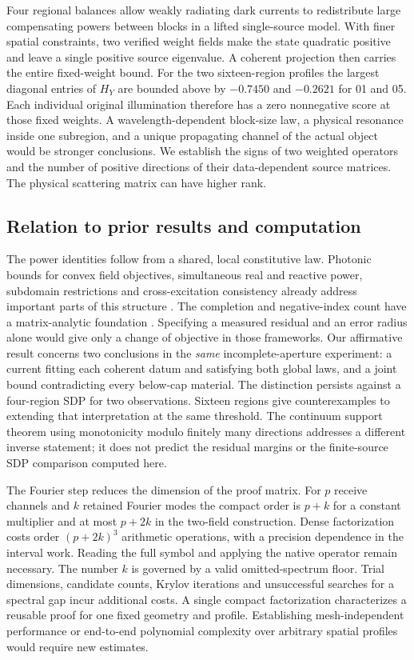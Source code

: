 \documentclass[anonymous,12pt]{iopjournal}
\theoremstyle{remark}\newtheorem{remark}[theorem]{Remark}
\numberwithin{equation}{section}
\begin{document}
Four regional balances allow weakly radiating dark currents to redistribute large compensating powers between blocks in a lifted single-source model. With finer spatial constraints, two verified weight fields make the state quadratic positive and leave a single positive source eigenvalue. A coherent projection then carries the entire fixed-weight bound. For the two sixteen-region profiles the largest diagonal entries of $H_Y$ are bounded above by $-0.7450$ and $-0.2621$ for 01 and 05. Each individual original illumination therefore has a zero nonnegative score at those fixed weights. A wavelength-dependent block-size law, a physical resonance inside one subregion, and a unique propagating channel of the actual object would be stronger conclusions. We establish the signs of two weighted operators and the number of positive directions of their data-dependent source matrices. The physical scattering matrix can have higher rank.

\subsection{Relation to prior results and computation}
The power identities follow from a shared, local constitutive law. Photonic bounds for convex field objectives, simultaneous real and reactive power, subdomain restrictions and cross-excitation consistency already address important parts of this structure \cite{trivedi,moleskyglobal,moleskylocal,shim}. The completion and negative-index count have a matrix-analytic foundation \cite{tian}. Specifying a measured residual and an error radius alone would give only a change of objective in those frameworks. Our affirmative result concerns two conclusions in the \emph{same} incomplete-aperture experiment: a current fitting each coherent datum and satisfying both global laws, and a joint bound contradicting every below-cap material. The distinction persists against a four-region SDP for two observations. Sixteen regions give counterexamples to extending that interpretation at the same threshold. The continuum support theorem using monotonicity modulo finitely many directions \cite{albicker} addresses a different inverse statement; it does not predict the residual margins or the finite-source SDP comparison computed here.

The Fourier step reduces the dimension of the proof matrix. For $p$ receive channels and $k$ retained Fourier modes the compact order is $p+k$ for a constant multiplier and at most $p+2k$ in the two-field construction. Dense factorization costs order $(p+2k)^3$ arithmetic operations, with a precision dependence in the interval work. Reading the full symbol and applying the native operator remain necessary. The number $k$ is governed by a valid omitted-spectrum floor. Trial dimensions, candidate counts, Krylov iterations and unsuccessful searches for a spectral gap incur additional costs. A single compact factorization characterizes a reusable proof for one fixed geometry and profile. Establishing mesh-independent performance or end-to-end polynomial complexity over arbitrary spatial profiles would require new estimates.
\end{document}
